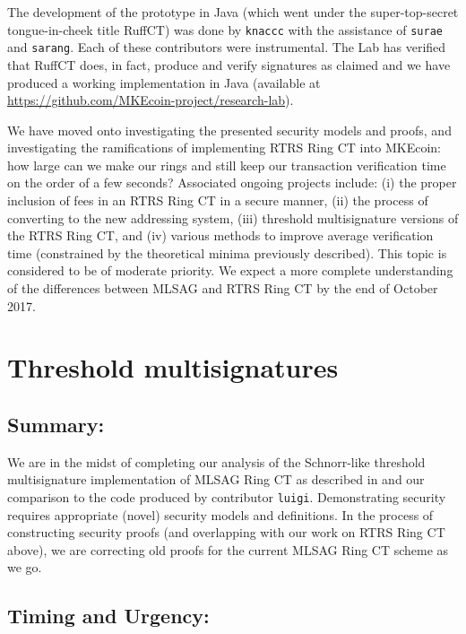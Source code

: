 \documentclass[12pt,english]{mrl}
\theoremstyle{definition}
\numberwithin{equation}{section}
\numberwithin{figure}{section}
\numberwithin{equation}{section}
\numberwithin{equation}{section}
\numberwithin{figure}{section}
\begin{document}
The development of the prototype in Java (which went under the super-top-secret tongue-in-cheek title RuffCT) was done by \texttt{knaccc} with the assistance of \texttt{surae} and \texttt{sarang}. Each of these contributors were instrumental. The Lab has verified that RuffCT does, in fact, produce and verify signatures as claimed and we have produced a working implementation in Java (available at \url{https://github.com/MKEcoin-project/research-lab}). 

We have moved onto investigating the presented security models and proofs, and investigating the ramifications of implementing RTRS Ring CT into MKEcoin: how large can we make our rings and still keep our transaction verification time on the order of a few seconds? Associated ongoing projects include: (i) the proper inclusion of fees in an RTRS Ring CT in a secure manner, (ii) the process of converting to the new addressing system, (iii) threshold multisignature versions of the RTRS Ring CT, and (iv) various methods to improve average verification time (constrained by the theoretical minima previously described). This topic is considered to be of moderate priority. We expect a more complete understanding of the differences between MLSAG and RTRS Ring CT by the end of October 2017.








\section{Threshold multisignatures} 

\subsection{Summary:} 

We are in the midst of completing our analysis of the Schnorr-like threshold multisignature implementation of MLSAG Ring CT as described in \cite{noether2016ring} and our comparison to the code produced by contributor \texttt{luigi}. Demonstrating security requires appropriate (novel) security models and definitions. In the process of constructing security proofs (and overlapping with our work on RTRS Ring CT above), we are correcting old proofs for the current MLSAG Ring CT scheme as we go.

\subsection{Timing and Urgency:} 
\end{document}
